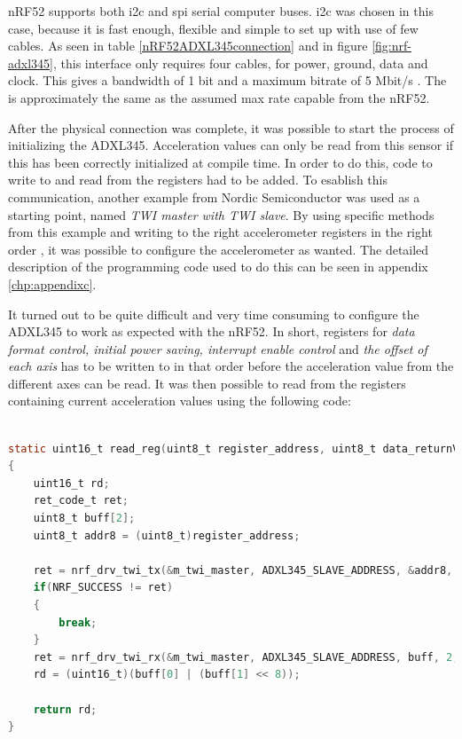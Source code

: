 \newpage

\noindent \gls{nRF52} supports both \gls{i2c} and \gls{spi} serial computer buses. \gls{i2c} was chosen in this case, because it is fast enough, flexible and simple to set up with use of few cables. As seen in table \ref{nRF52ADXL345connection} and in figure \ref{fig:nrf-adxl345}, this interface only requires four cables, for power, ground, data and clock. This gives a bandwidth of 1 bit and a maximum bitrate of 5 Mbit/s \cite{semiconductors2000i2c}. The is approximately the same as the assumed max rate capable from the \gls{nRF52}. 

\noindent After the physical connection was complete, it was possible to start the process of initializing the \gls{ADXL345}. Acceleration values can only be read from this sensor if this has been correctly initialized at compile time. In order to do this, code to write to and read from the registers had to be added. To esablish this communication, another example from Nordic Semiconductor was used as a starting point, named \textit{TWI master with TWI slave}. By using specific methods from this example and writing to the right accelerometer registers in the right order \cite{devices2009digital}, it was possible to configure the accelerometer as wanted. The detailed description of the programming code used to do this can be seen in appendix \ref{chp:appendixc}. 

\noindent It turned out to be quite difficult and very time consuming to configure the \gls{ADXL345} to work as expected with the \gls{nRF52}. In short, registers for \textit{data format control, initial power saving, interrupt enable control} and \textit{the offset of each axis} has to be written to in that order before the acceleration value from the different axes can be read. It was then possible to read from the registers containing current acceleration values using the following code: 

\begin{lstlisting}[language=C]

static uint16_t read_reg(uint8_t register_address, uint8_t data_returnValue) 
{
	uint16_t rd;
	ret_code_t ret;
	uint8_t buff[2];
    uint8_t addr8 = (uint8_t)register_address;
    
    ret = nrf_drv_twi_tx(&m_twi_master, ADXL345_SLAVE_ADDRESS, &addr8, 1, true);
    if(NRF_SUCCESS != ret)
    {
        break;
    }
    ret = nrf_drv_twi_rx(&m_twi_master, ADXL345_SLAVE_ADDRESS, buff, 2, false);
	rd = (uint16_t)(buff[0] | (buff[1] << 8));
    
    return rd;	
}

\end{lstlisting}


